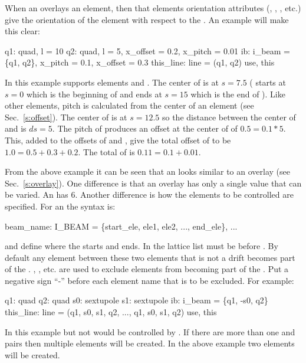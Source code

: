 When an  overlays an element, then that elements
orientation attributes (, , , etc.) 
give the orientation of
the element with respect to the . An example will make this clear:
\begin{example}
  q1: quad, l = 10
  q2: quad, l = 5, x_offset = 0.2, x_pitch = 0.01
  ib: i_beam = \{q1, q2\}, x_pitch = 0.1, x_offset = 0.3
  this_line: line = (q1, q2)
  use, this
\end{example}
In this example  supports elements  and . The
center of  is at $s = 7.5$ ( starts at $s = 0$ which is
the beginning of  and ends at $s = 15$ which is the end of
). Like other elements, pitch is calculated from the center of
an  element (see Sec.~\ref{s:offset}). The center of
 is at $s = 12.5$ so the distance between the center of 
and  is $ds = 5$. The pitch of  produces an offset at
the center of  of $0.5 = 0.1 * 5$. This, added to the offsets
of  and , give the total offset of  to be $1.0 =
0.5 + 0.3 + 0.2$. The total  of  is $0.11 = 0.1 +
0.01$.

From the above example it can be seen that an  looks similar to
an overlay (see Sec.~\ref{s:overlay}). One difference is that an
overlay has only a single value that can be varied. An  has
6.  Another difference is how the elements to be controlled are
specified. For an  the syntax is:
\begin{example}
  beam_name: I_BEAM = \{start_ele, ele1, ele2, ..., end_ele\}, ...
\end{example}
 and  define where the  starts
and ends. In the lattice list  must be before
. By default any element between these two elements that
is not a drift becomes part of the . , ,
etc. are used to exclude elements from becoming part of the
.  Put a negative sign ``-'' before each element name that
is to be excluded. For example:
\begin{example}
  q1: quad
  q2: quad
  s0: sextupole
  s1: sextupole
  ib: i_beam = \{q1, -s0, q2\}
  this_line: line = (q1, s0, s1, q2, ..., q1, s0, s1, q2)
  use, this
\end{example}
In this example  but not  would be controlled by
.  If there are more than one  and 
pairs then multiple  elements will be created. In the above
example two  elements will be created.

